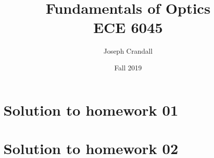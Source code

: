 

\usepackage{subfiles}
\usepackage{color,soul}
\usepackage{siunitx}
\usepackage{gensymb}

\title{Fundamentals of Optics\\
\large ECE 6045}
\author{Joseph Crandall}
\date{Fall 2019}


\maketitle

\section{Solution to homework 01}


\section{Solution to homework 02}


%

%

%


%


